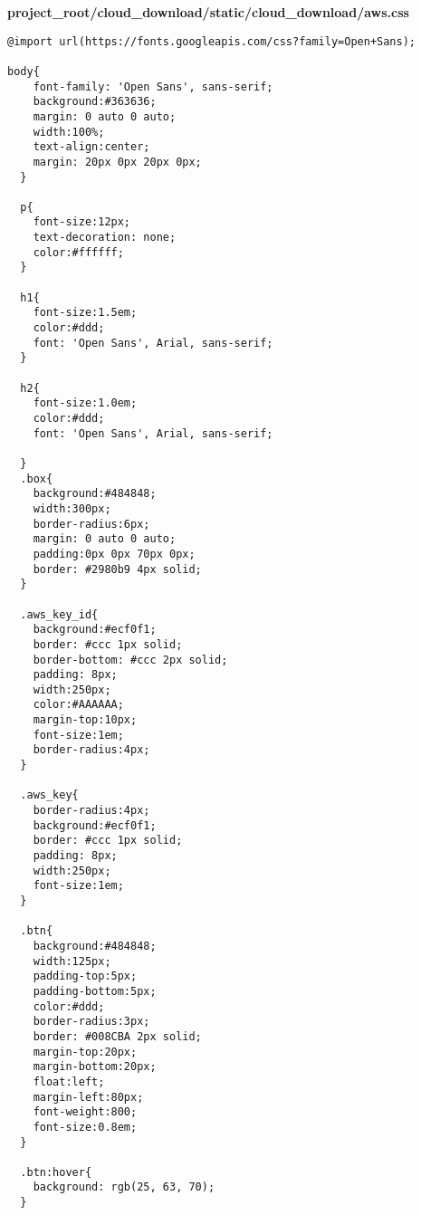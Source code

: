 \documentclass{article}
\begin{document}
\newpage
\textbf{project\_root/cloud\_download/static/cloud\_download/aws.css}
\begin{verbatim}
@import url(https://fonts.googleapis.com/css?family=Open+Sans);

body{
    font-family: 'Open Sans', sans-serif;
    background:#363636;
    margin: 0 auto 0 auto;  
    width:100%; 
    text-align:center;
    margin: 20px 0px 20px 0px;   
  }
  
  p{
    font-size:12px;
    text-decoration: none;
    color:#ffffff;
  }
  
  h1{
    font-size:1.5em;
    color:#ddd;
    font: 'Open Sans', Arial, sans-serif;
  }
  
  h2{
    font-size:1.0em;
    color:#ddd;
    font: 'Open Sans', Arial, sans-serif;

  }
  .box{
    background:#484848;
    width:300px;
    border-radius:6px;
    margin: 0 auto 0 auto;
    padding:0px 0px 70px 0px;
    border: #2980b9 4px solid; 
  }
  
  .aws_key_id{
    background:#ecf0f1;
    border: #ccc 1px solid;
    border-bottom: #ccc 2px solid;
    padding: 8px;
    width:250px;
    color:#AAAAAA;
    margin-top:10px;
    font-size:1em;
    border-radius:4px;
  }
  
  .aws_key{
    border-radius:4px;
    background:#ecf0f1;
    border: #ccc 1px solid;
    padding: 8px;
    width:250px;
    font-size:1em;
  }
  
  .btn{
    background:#484848;
    width:125px;
    padding-top:5px;
    padding-bottom:5px;
    color:#ddd;
    border-radius:3px;
    border: #008CBA 2px solid;
    margin-top:20px;
    margin-bottom:20px;
    float:left;
    margin-left:80px;
    font-weight:800;
    font-size:0.8em;
  }
  
  .btn:hover{
    background: rgb(25, 63, 70);
  }
\end{verbatim}
\end{document}
